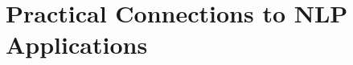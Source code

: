 \documentclass[aspectratio=169,cramped]{beamer}
\begin{document}
\section{Practical Connections to NLP Applications}

\end{document}
